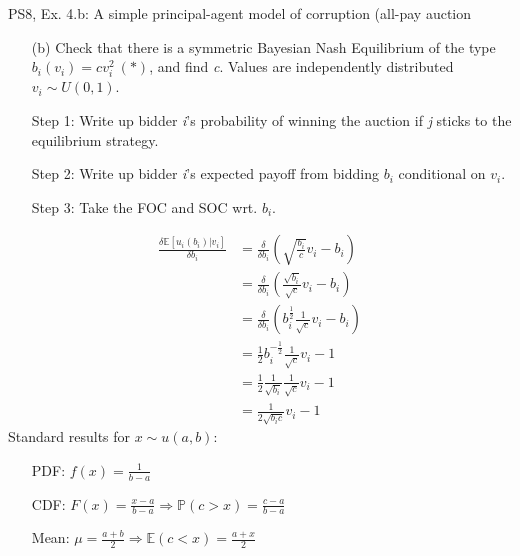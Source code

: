 \begin{frame}{PS8, Ex. 4.b: A simple principal-agent model of corruption (all-pay auction}
    \begin{itemize}
      \item[(b)] Check that there is a symmetric Bayesian Nash Equilibrium of the type $b_i(v_i) = cv_i^2\ (*)$, and find \textit{c}. Values are independently distributed $v_i\sim U(0, 1)$.
    \end{itemize} \vspace{-8pt}
    \begin{multicols}{2}
      \begin{itemize}
        \item[Step 1:] Write up bidder \textit{i}'s probability of winning the auction if \textit{j} sticks to the equilibrium strategy.
        \item[Step 2:] Write up bidder \textit{i}'s expected payoff from bidding $b_i$ conditional on $v_i$.
        \item[Step 3:] Take the FOC and SOC wrt. $b_i$.
      \end{itemize} \vspace{-8pt}
      \begin{align*}
        \frac{\delta\mathbb{E}[u_i(b_i)|v_i]}{\delta b_i}
          &=\frac{\delta}{\delta b_i}\left(\sqrt{\frac{b_i}{c}}v_i-b_i\right)\\
          &=\frac{\delta}{\delta b_i}\left(\frac{\sqrt{b_i}}{\sqrt{c}}v_i-b_i\right)\\
          &=\frac{\delta}{\delta b_i}\left(b_i^{\frac{1}{2}}\frac{1}{\sqrt{c}}v_i-b_i\right)\\
          &=\frac{1}{2}b_i^{-\frac{1}{2}}\frac{1}{\sqrt{c}}v_i-1\\
          &=\frac{1}{2}\frac{1}{\sqrt{b_i}}\frac{1}{\sqrt{c}}v_i-1\\
          &=\frac{1}{2\sqrt{b_ic}}v_i-1
      \end{align*}
      \vfill\null\columnbreak
      Standard results for $x\sim u(a, b):$ \vspace{-6pt}
      \begin{itemize}
        \item[PDF:] $f(x)=\frac{1}{b-a}$
        \item[CDF:] $F(x)=\frac{x-a}{b-a}\Rightarrow\mathbb{P}(c>x)=\frac{c-a}{b-a}$
        \item[Mean:] $\mu=\frac{a+b}{2}\Rightarrow\mathbb{E}(c<x)=\frac{a+x}{2}$
      \end{itemize}
      \vspace{-6pt}

\end{multicols}
\end{frame}
